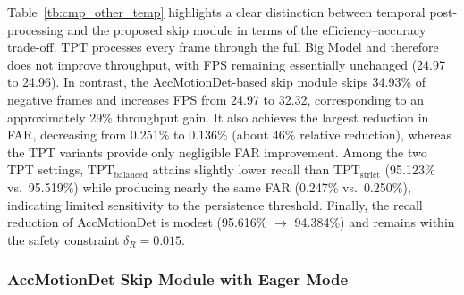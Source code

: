 \documentclass[final,3p,times,twocolumn]{elsarticle}
\begin{document}
Table~\ref{tb:cmp_other_temp} highlights a clear distinction between
temporal post-processing and the proposed skip module in terms of the
efficiency--accuracy trade-off. TPT processes every frame through the
full Big Model and therefore does not improve throughput, with FPS
remaining essentially unchanged (24.97 to 24.96). In contrast, the
AccMotionDet-based skip module skips 34.93\% of negative frames and
increases FPS from 24.97 to 32.32, corresponding to an approximately
29\% throughput gain. It also achieves the largest reduction in FAR,
decreasing from 0.251\% to 0.136\% (about 46\% relative reduction),
whereas the TPT variants provide only negligible FAR improvement. Among
the two TPT settings, $\text{TPT}_\text{balanced}$ attains slightly
lower recall than $\text{TPT}_\text{strict}$ (95.123\% vs.~95.519\%)
while producing nearly the same FAR (0.247\% vs.~0.250\%), indicating
limited sensitivity to the persistence threshold. Finally, the recall
reduction of AccMotionDet is modest (95.616\% $\to$ 94.384\%) and
remains within the safety constraint $\delta_R = 0.015$.

\subsubsection{AccMotionDet Skip Module with Eager Mode}\label{accmotiondet-skip-module-with-eager-mode}

\begin{table}[t]
\caption{Representative validation-set grid search results for
\textsc{AccMotionDet} (optimal configuration from
Section~\ref{sec:hyperparam}) augmented with \textsc{Eager} mode. The
``Recall (\%)'' column reports retained recall with the absolute drop
relative to the baseline in parentheses (i.e., Recall $-$ Recall
Drop). The best and second-best results per metric are highlighted in
\textbf{bold} and \textit{\underline{italic underline}}, respectively.}
\label{tb:gridsearch_accMotionDetEager}
\end{table}
\end{document}
